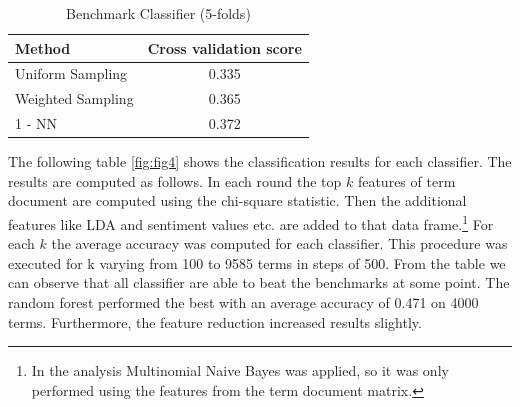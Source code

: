 \documentclass[12pt,a4paper,bibliography=totocnumbered,listof=totocnumbered]{scrartcl}
\begin{document}
\begin{table}[H]
	\centering
	\scriptsize
	\begin{tabular}{l c }
		\toprule 
		\textbf{Method} & \textbf{Cross validation score}  \\
		\hline
		Uniform Sampling & 0.335 \\
		Weighted Sampling & 0.365 \\
		1 - NN & 0.372 \\
		\bottomrule 
	\end{tabular}
	\caption{Benchmark Classifier (5-folds)}
	\label{tab:summarybench}
\end{table}

The following table \ref{fig:fig4}  shows the classification results for each classifier. The results are computed as follows. In each round the top $k$ features of term document  are computed using the chi-square statistic. Then the additional features like LDA and sentiment values etc. are added to that data frame.\footnote{In the analysis Multinomial Naive Bayes was applied, so it was only performed using the features from the term document matrix. } For each $k$ the average accuracy was computed for each classifier. This procedure was executed for k varying from 100 to 9585 terms in steps of 500. From the table we can observe that all classifier are able to beat the benchmarks at some  point. The random forest performed the best with an average accuracy of 0.471 on 4000 terms. Furthermore, the feature reduction increased results slightly.\\
\end{document}
